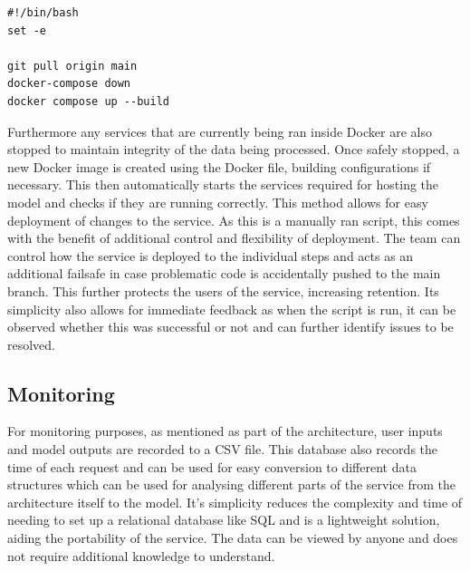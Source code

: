 \documentclass{surreydissertation}
\begin{document}

\begin{lstlisting}[style=bash, caption={deploy.sh Bash Script}, label={lst:script}]
#!/bin/bash
set -e

git pull origin main
docker-compose down
docker compose up --build
\end{lstlisting}

Furthermore any services that are currently being ran inside Docker are also stopped to maintain integrity of the data being processed. Once safely stopped, a new Docker image is created using the Docker file, building configurations if necessary. This then automatically starts the services required for hosting the model and checks if they are running correctly. This method allows for easy deployment of changes to the service. As this is a manually ran script, this comes with the benefit of additional control and flexibility of deployment. The team can control how the service is deployed to the individual steps and acts as an additional failsafe in case problematic code is accidentally pushed to the main branch. This further protects the users of the service, increasing retention. Its simplicity also allows for immediate feedback as when the script is run, it can be observed whether this was successful or not and can further identify issues to be resolved. 

\subsection{Monitoring}
For monitoring purposes, as mentioned as part of the architecture, user inputs and model outputs are recorded to a CSV file. This database also records the time of each request and can be used for easy conversion to different data structures which can be used for analysing different parts of the service from the architecture itself to the model. It's simplicity reduces the complexity and time of needing to set up a relational database like SQL and is a lightweight solution, aiding the portability of the service. The data can be viewed by anyone and does not require additional knowledge to understand.
\end{document}
